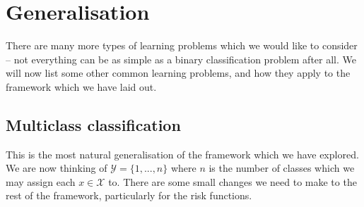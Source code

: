 \section{Generalisation}
There are many more types of learning problems which we would like to consider -- not everything can be as simple as a binary classification problem after all. We will now list some other common learning problems, and how they apply to the framework which we have laid out.

\subsection{Multiclass classification}
This is the most natural generalisation of the framework which we have explored. We are now thinking of $ \mathcal{Y} = \{ 1,..., n \} $ where $ n $ is the number of classes which we may assign each $ x \in \mathcal{X} $ to. There are some small changes we need to make to the rest of the framework, particularly for the risk functions.

